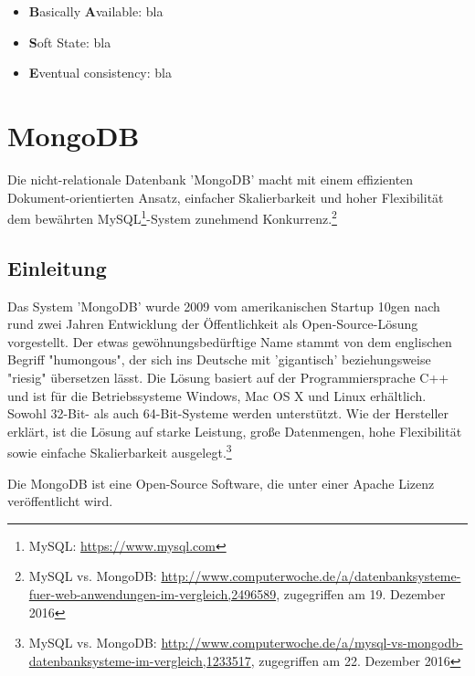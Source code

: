 \begin{itemize}
\item \textbf{B}asically \textbf{A}vailable: bla

\item \textbf{S}oft State: bla

\item \textbf{E}ventual consistency: bla
\end{itemize}

\section{MongoDB}\label{mongo}
Die nicht-relationale Datenbank 'MongoDB' macht mit einem effizienten Dokument-orientierten Ansatz, einfacher Skalierbarkeit und hoher Flexibilität dem bewährten MySQL\footnote{MySQL: \url{https://www.mysql.com}}-System zunehmend Konkurrenz.\footnote{MySQL vs. MongoDB: \url{http://www.computerwoche.de/a/datenbanksysteme-fuer-web-anwendungen-im-vergleich,2496589}, zugegriffen am 19. Dezember 2016}

\subsection{Einleitung}
Das System 'MongoDB' wurde 2009 vom amerikanischen Startup 10gen nach rund zwei Jahren Entwicklung der Öffentlichkeit als Open-Source-Lösung vorgestellt. Der etwas gewöhnungsbedürftige Name stammt von dem englischen Begriff "humongous", der sich ins Deutsche mit 'gigantisch'  beziehungsweise "riesig" übersetzen lässt. Die Lösung basiert auf der Programmiersprache C++ und ist für die Betriebssysteme Windows, Mac OS X und Linux erhältlich. Sowohl 32-Bit- als auch 64-Bit-Systeme werden unterstützt. Wie der Hersteller erklärt, ist die Lösung auf starke Leistung, große Datenmengen, hohe Flexibilität sowie einfache Skalierbarkeit ausgelegt.\footnote{MySQL vs. MongoDB: \url{http://www.computerwoche.de/a/mysql-vs-mongodb-datenbanksysteme-im-vergleich,1233517}, zugegriffen am 22. Dezember 2016}

Die MongoDB ist eine Open-Source Software, die unter einer Apache Lizenz veröffentlicht wird. 

